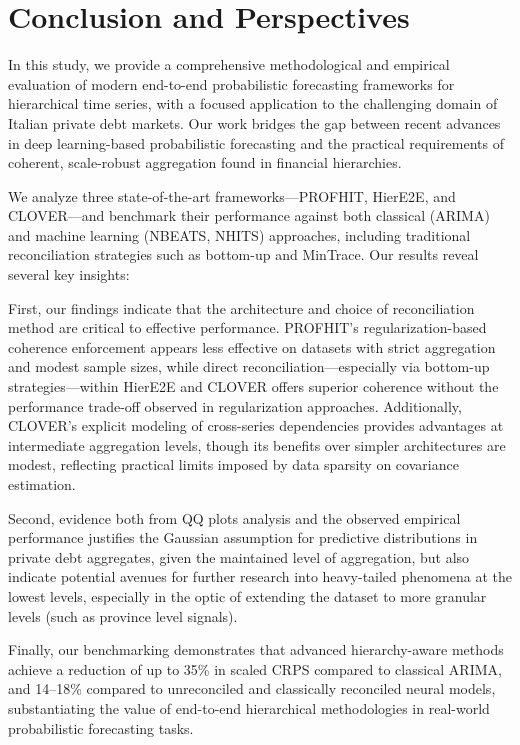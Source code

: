 \documentclass[letterpaper]{article}
\begin{document}
\section{Conclusion and Perspectives}

In this study, we provide a comprehensive methodological and empirical evaluation of modern end-to-end probabilistic forecasting frameworks for hierarchical time series, with a focused application to the challenging domain of Italian private debt markets. Our work bridges the gap between recent advances in deep learning-based probabilistic forecasting and the practical requirements of coherent, scale-robust aggregation found in financial hierarchies.

We analyze three state-of-the-art frameworks---PROFHIT, HierE2E, and CLOVER---and benchmark their performance against both classical (ARIMA) and machine learning (NBEATS, NHITS) approaches, including traditional reconciliation strategies such as bottom-up and MinTrace. Our results reveal several key insights:



First, our findings indicate that the architecture and choice of reconciliation method are critical to effective performance. PROFHIT’s regularization-based coherence enforcement appears less effective on datasets with strict aggregation and modest sample sizes, while direct reconciliation---especially via bottom-up strategies---within HierE2E and CLOVER offers superior coherence without the performance trade-off observed in regularization approaches. Additionally, CLOVER’s explicit modeling of cross-series dependencies provides advantages at intermediate aggregation levels, though its benefits over simpler architectures are modest, reflecting practical limits imposed by data sparsity on covariance estimation.

Second, evidence both from QQ plots analysis and the observed empirical performance justifies the Gaussian assumption for predictive distributions in private debt aggregates, given the maintained level of aggregation, but also indicate potential avenues for further research into heavy-tailed phenomena at the lowest levels, especially in the optic of extending the dataset to more granular levels (such as province level signals). 

Finally, our benchmarking demonstrates that advanced hierarchy-aware methods achieve a reduction of up to 35\% in scaled CRPS compared to classical ARIMA, and 14--18\% compared to unreconciled and classically reconciled neural models, substantiating the value of end-to-end hierarchical methodologies in real-world probabilistic forecasting tasks. 
\end{document}

